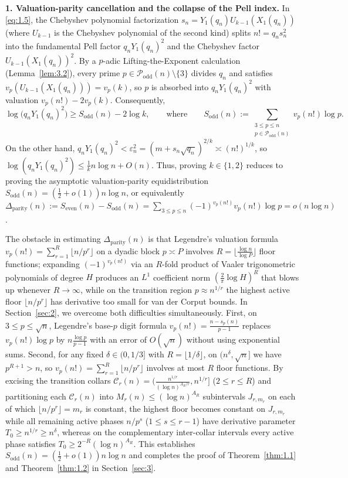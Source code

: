 \documentclass[11pt,reqno]{amsart}
\theoremstyle{remark}
\numberwithin{equation}{section}
\newcommand{\Podd}{\mathcal{P}_{\mathrm{odd}}}
\newcommand{\Sodd}{S_{\mathrm{odd}}}
\newcommand{\Seven}{S_{\mathrm{even}}}
\newcommand{\Dparity}{\Delta_{\mathrm{parity}}}
\begin{document}
\medskip
\noindent\textbf{1. Valuation-parity cancellation and the collapse of the Pell index.}
In \eqref{eq:1.5}, the Chebyshev polynomial factorization $s_n = Y_1(q_n)U_{k-1}(X_1(q_n))$ (where $U_{k-1}$ is the Chebyshev polynomial of the second kind) splits $n! = q_n s_n^2$ into the fundamental Pell factor $q_n Y_1(q_n)^2$ and the Chebyshev factor $U_{k-1}(X_1(q_n))^2$. By a $p$-adic Lifting-the-Exponent calculation (Lemma~\ref{lem:3.2}), every prime $p \in \Podd(n) \setminus \{3\}$ divides $q_n$ and satisfies $v_p(U_{k-1}(X_1(q_n))) = v_p(k)$, so $p$ is absorbed into $q_n Y_1(q_n)^2$ with valuation $v_p(n!) - 2v_p(k)$. Consequently,
\[
\log\bigl(q_n Y_1(q_n)^2\bigr) \ge \Sodd(n) - 2\log k, \qquad \text{where} \qquad \Sodd(n) := \sum_{\substack{3 \le p \le n \\ p \in \Podd(n)}} v_p(n!)\log p.
\]
On the other hand, $q_n Y_1(q_n)^2 < \varepsilon_n^2 = (m + s_n\sqrt{q_n})^{2/k} \asymp (n!)^{1/k}$, so $\log(q_n Y_1(q_n)^2) \le \frac{1}{k}n\log n + O(n)$. Thus, proving $k \in \{1, 2\}$ reduces to proving the asymptotic valuation-parity equidistribution $\Sodd(n) = (\frac{1}{2} + o(1))n\log n$, or equivalently $\Dparity(n) := \Seven(n) - \Sodd(n) = \sum_{3 \le p \le n} (-1)^{v_p(n!)} v_p(n!)\log p = o(n\log n)$.

The obstacle in estimating $\Dparity(n)$ is that Legendre's valuation formula $v_p(n!) = \sum_{r=1}^R \lfloor n/p^r \rfloor$ on a dyadic block $p \asymp P$ involves $R = \lfloor \frac{\log n}{\log P} \rfloor$ floor functions; expanding $(-1)^{v_p(n!)}$ via an $R$-fold product of Vaaler trigonometric polynomials of degree $H$ produces an $L^1$ coefficient norm $(\frac{2}{\pi}\log H)^R$ that blows up whenever $R \to \infty$, while on the transition region $p \approx n^{1/r}$ the highest active floor $\lfloor n/p^r \rfloor$ has derivative too small for van der Corput bounds. In Section~\ref{sec:2}, we overcome both difficulties simultaneously. First, on $3 \le p \le \sqrt{n}$, Legendre's base-$p$ digit formula $v_p(n!) = \frac{n - s_p(n)}{p - 1}$ replaces $v_p(n!)\log p$ by $n\frac{\log p}{p - 1}$ with an error of $O(\sqrt{n})$ without using exponential sums. Second, for any fixed $\delta \in (0, 1/3]$ with $R = \lfloor 1/\delta \rfloor$, on $(n^\delta, \sqrt{n}]$ we have $p^{R+1} > n$, so $v_p(n!) = \sum_{r=1}^R \lfloor n/p^r \rfloor$ involves at most $R$ floor functions. By excising the transition collars $\mathcal{C}_r(n) = (\frac{n^{1/r}}{(\log n)^{A_R/r}}, n^{1/r}]$ ($2 \le r \le R$) and partitioning each $\mathcal{C}_r(n)$ into $M_r(n) \le (\log n)^{A_R}$ subintervals $J_{r,m_r}$ on each of which $\lfloor n/p^r \rfloor = m_r$ is constant, the highest floor becomes constant on $J_{r,m_r}$ while all remaining active phases $n/p^s$ ($1 \le s \le r-1$) have derivative parameter $T_0 \ge n^{1/r} \ge n^\delta$, whereas on the complementary inter-collar intervals every active phase satisfies $T_0 \ge 2^{-R}(\log n)^{A_R}$. This establishes $\Sodd(n) = (\frac{1}{2} + o(1))n\log n$ and completes the proof of Theorem~\ref{thm:1.1} and Theorem~\ref{thm:1.2} in Section~\ref{sec:3}.
\end{document}
